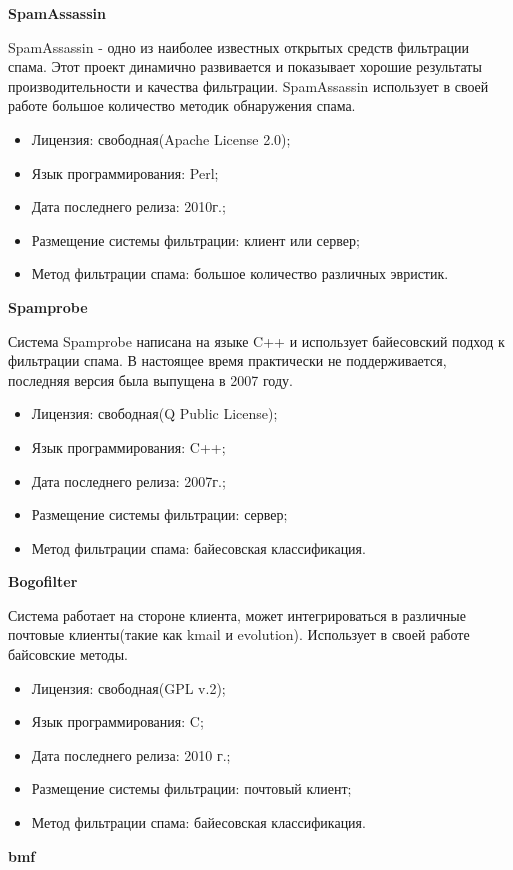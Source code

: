 \textbf{SpamAssassin}

SpamAssassin - одно из наиболее известных открытых средств фильтрации спама. Этот проект динамично развивается и показывает хорошие результаты производительности и качества фильтрации. SpamAssassin использует в своей работе большое количество методик обнаружения спама.

\begin{itemize}
\item Лицензия: свободная(Apache License 2.0);
\item Язык программирования: Perl;
\item Дата последнего релиза: 2010г.;
\item Размещение системы фильтрации: клиент или сервер;
\item Метод фильтрации спама: большое количество различных эвристик.
\end{itemize}

\textbf{Spamprobe}

Система Spamprobe написана на языке C++ и использует байесовский подход к фильтрации спама. В настоящее время практически не поддерживается, последняя версия была выпущена в 2007 году.
\begin{itemize}
\item Лицензия: свободная(Q Public License); 
\item Язык программирования: C++;
\item Дата последнего релиза: 2007г.;
\item Размещение системы фильтрации: сервер;
\item Метод фильтрации спама: байесовская классификация.
\end{itemize}

\textbf{Bogofilter}

Система работает на стороне клиента, может интегрироваться в различные почтовые клиенты(такие как kmail и evolution). Использует в своей работе байсовские методы.
\begin{itemize}
\item Лицензия: свободная(GPL v.2); 
\item Язык программирования: C;
\item Дата последнего релиза: 2010 г.;
\item Размещение системы фильтрации: почтовый клиент;
\item Метод фильтрации спама: байесовская классификация.
\end{itemize}

\textbf{bmf}

